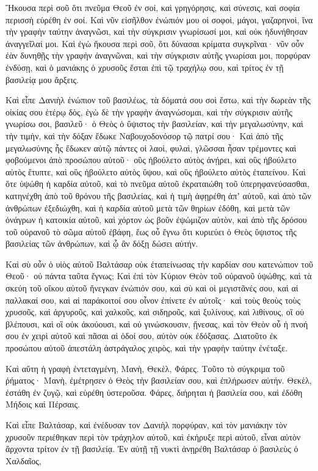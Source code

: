 {Ἤκουσα περὶ σοῦ ὅτι πνεῦμα Θεοῦ ἐν σοί, καὶ γρηγόρησις, καὶ σύνεσις, καὶ σοφία περισσὴ εὑρέθη ἐν σοί.
Καὶ νῦν εἰσῆλθον ἐνώπιόν μου οἱ σοφοὶ, μάγοι, γαζαρηνοὶ, ἵνα τὴν γραφὴν ταύτην ἀναγνῶσι, καὶ τὴν σύγκρισιν γνωρίσωσί μοι, καὶ οὐκ ἠδυνήθησαν ἀναγγεῖλαί μοι.
Καὶ ἐγὼ ἤκουσα περὶ σοῦ, ὅτι δύνασαι κρίματα συγκρῖναι· νῦν οὖν ἐὰν δυνηθῇς τὴν γραφὴν ἀναγνῶναι, καὶ τὴν σύγκρισιν αὐτῆς γνωρίσαι μοι, πορφύραν ἐνδύσῃ, καὶ ὁ μανιάκης ὁ χρυσοῦς ἔσται ἐπὶ τῷ τραχήλῳ σου, καὶ τρίτος ἐν τῇ βασιλείᾳ μου ἄρξεις.
\par }{\PP {}Καὶ εἶπε Δανιὴλ ἐνώπιον τοῦ βασιλέως, τὰ δόματά σου σοὶ ἔστω, καὶ τὴν δωρεὰν τῆς οἰκίας σου ἑτέρῳ δὸς, ἐγὼ δὲ τὴν γραφὴν ἀναγνώσομαι, καὶ τὴν σύγκρισιν αὐτῆς γνωρίσω σοι,
βασιλεῦ· ὁ Θεὸς ὁ ὕψιστος τὴν βασιλείαν, καὶ τὴν μεγαλωσύνην, καὶ τὴν τιμὴν, καὶ τὴν δόξαν ἔδωκε Ναβουχοδονόσορ τῷ πατρί σου·
Καὶ ἀπὸ τῆς μεγαλωσύνης ἧς ἔδωκεν αὐτῷ πάντες οἱ λαοὶ, φυλαὶ, γλῶσσαι ἦσαν τρέμοντες καὶ φοβούμενοι ἀπὸ προσώπου αὐτοῦ· οὓς ἠβούλετο αὐτὸς ἀνῄρει, καὶ οὓς ἠβούλετο αὐτὸς ἔτυπτε, καὶ οὓς ἠβούλετο αὐτὸς ὕψου, καὶ οὓς ἠβούλετο αὐτὸς ἐταπείνου.
Καὶ ὅτε ὑψώθη ἡ καρδία αὐτοῦ, καὶ τὸ πνεῦμα αὐτοῦ ἐκραταιώθη τοῦ ὑπερηφανεύσασθαι, κατηνέχθη ἀπὸ τοῦ θρόνου τῆς βασιλείας, καὶ ἡ τιμὴ ἀφῃρέθη ἀπʼ αὐτοῦ,
καὶ ἀπὸ τῶν ἀνθρώπων ἐξεδιώχθη, καὶ ἡ καρδία αὐτοῦ μετὰ τῶν θηρίων ἐδόθη, καὶ μετὰ τῶν ὀνάγρων ἡ κατοικία αὐτοῦ, καὶ χόρτον ὡς βοῦν ἐψώμιζον αὐτὸν, καὶ ἀπὸ τῆς δρόσου τοῦ οὐρανοῦ τὸ σῶμα αὐτοῦ ἐβάφη, ἕως οὗ ἔγνω ὅτι κυριεύει ὁ Θεὸς ὕψιστος τῆς βασιλείας τῶν ἀνθρώπων, καὶ ᾧ ἂν δόξῃ δώσει αὐτήν.
\par }{\PP {}Καὶ σὺ οὖν ὁ υἱὸς αὐτοῦ Βαλτάσαρ οὐκ ἐταπείνωσας τὴν καρδίαν σου κατενώπιον τοῦ Θεοῦ· οὐ πάντα ταῦτα ἔγνως;
Καὶ ἐπὶ τὸν Κύριον Θεὸν τοῦ οὐρανοῦ ὑψώθης, καὶ τὰ σκεύη τοῦ οἴκου αὐτοῦ ἤνεγκαν ἐνώπιόν σου, καὶ σὺ καὶ οἱ μεγιστᾶνές σου, καὶ αἱ παλλακαί σου, καὶ αἱ παράκοιτοί σου οἶνον ἐπίνετε ἐν αὐτοῖς· καὶ τοὺς θεοὺς τοὺς χρυσοῦς, καὶ ἀργυροῦς, καὶ χαλκοῦς, καὶ σιδηροῦς, καὶ ξυλίνους, καὶ λιθίνους, οἳ οὐ βλέπουσι, καὶ οἳ οὐκ ἀκούουσι, καὶ οὐ γινώσκουσιν, ᾔνεσας, καὶ τὸν Θεὸν οὗ ἡ πνοή σου ἐν χειρὶ αὐτοῦ καὶ πᾶσαι αἱ ὁδοί σου, αὐτὸν οὐκ ἐδόξασας.
Διατοῦτο ἐκ προσώπου αὐτοῦ ἀπεστάλη ἀστράγαλος χειρὸς, καὶ τὴν γραφὴν ταύτην ἐνέταξε.
\par }{\PP {}Καὶ αὕτη ἡ γραφὴ ἐντεταγμένη, Μανὴ, Θεκὲλ, Φάρες.
Τοῦτο τὸ σύγκριμα τοῦ ῥήματος· Μανὴ, ἐμέτρησεν ὁ Θεὸς τὴν βασιλείαν σου, καὶ ἐπλήρωσεν αὐτήν.
Θεκὲλ, ἐστάθη ἐν ζυγῷ, καὶ εὑρέθη ὑστεροῦσα.
Φάρες, διήρηται ἡ βασιλεία σου, καὶ ἐδόθη Μήδοις καὶ Πέρσαις.
\par }{\PP {}Καὶ εἶπε Βαλτάσαρ, καὶ ἐνέδυσαν τον Δανιὴλ πορφύραν, καὶ τὸν μανιάκην τὸν χρυσοῦν περιέθηκαν περὶ τὸν τράχηλον αὐτοῦ, καὶ ἐκήρυξε περὶ αὐτοῦ, εἶναι αὐτὸν ἄρχοντα τρίτον ἐν τῇ βασιλείᾳ.
Ἐν αὐτῇ τῇ νυκτὶ ἀνῃρέθη Βαλτάσαρ ὁ βασιλεὺς ὁ Χαλδαῖος,

}
